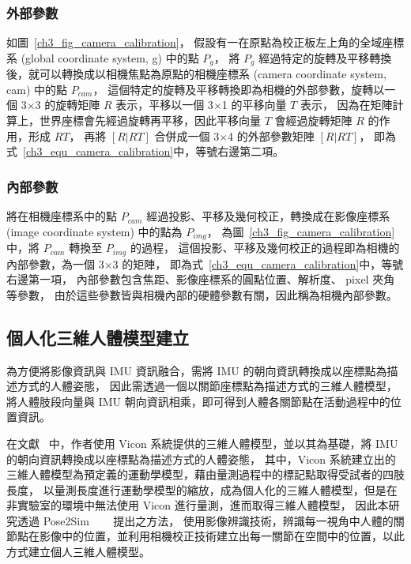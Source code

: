 \subsubsection*{外部參數}
如圖~\ref{ch3_fig_camera_calibration}，
假設有一在原點為校正板左上角的全域座標系 (global coordinate system, g) 中的點 $P_g$，
將 $P_g$ 經過特定的旋轉及平移轉換後，就可以轉換成以相機焦點為原點的相機座標系 (camera coordinate system, cam) 中的點 $P_{cam}$，
這個特定的旋轉及平移轉換即為相機的外部參數，旋轉以一個 3$\times$3 的旋轉矩陣 $R$ 表示，平移以一個 3$\times$1 的平移向量 $T$ 表示，
因為在矩陣計算上，世界座標會先經過旋轉再平移，因此平移向量 $T$ 會經過旋轉矩陣 $R$ 的作用，形成 $RT$，
再將 $[R|RT]$ 合併成一個 3$\times$4 的外部參數矩陣 $[R|RT]$，
即為式~\ref{ch3_equ_camera_calibration}中，等號右邊第二項。

\subsubsection*{內部參數}
將在相機座標系中的點 $P_{cam}$ 經過投影、平移及幾何校正，轉換成在影像座標系 (image coordinate system) 中的點為 $P_{img}$，
為圖~\ref{ch3_fig_camera_calibration}中，將 $P_{cam}$ 轉換至 $P_{img}$ 的過程，
這個投影、平移及幾何校正的過程即為相機的內部參數，為一個 3$\times$3 的矩陣，
即為式~\ref{ch3_equ_camera_calibration}中，等號右邊第一項，
內部參數包含焦距、影像座標系的圓點位置、解析度、 pixel 夾角等參數，
由於這些參數皆與相機內部的硬體參數有關，因此稱為相機內部參數。

\subsection{個人化三維人體模型建立}\label{ch3_skeleton_method}
為方便將影像資訊與 IMU 資訊融合，需將 IMU 的朝向資訊轉換成以座標點為描述方式的人體姿態，
因此需透過一個以關節座標點為描述方式的三維人體模型，將人體肢段向量與 IMU 朝向資訊相乘，即可得到人體各關節點在活動過程中的位置資訊。

在文獻~\cite{Zhang_2020_CVPR} 中，作者使用 Vicon 系統提供的三維人體模型，並以其為基礎，將 IMU 的朝向資訊轉換成以座標點為描述方式的人體姿態，
其中，Vicon 系統建立出的三維人體模型為預定義的運動學模型，藉由量測過程中的標記點取得受試者的四肢長度，
以量測長度進行運動學模型的縮放，成為個人化的三維人體模型，但是在非實驗室的環境中無法使用 Vicon 進行量測，進而取得三維人體模型，
因此本研究透過 Pose2Sim ~\cite{Pagnon_2022_JOSS}~\cite{Pagnon_2021_Robustness}~\cite{Pagnon_2022_Accuracy} 提出之方法，
使用影像辨識技術，辨識每一視角中人體的關節點在影像中的位置，並利用相機校正技術建立出每一關節在空間中的位置，以此方式建立個人三維人體模型。


